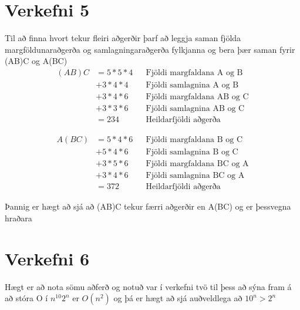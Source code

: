 \documentclass{article}
\begin{document}
\newpage
\section*{Verkefni 5}
Til að finna hvort tekur fleiri aðgerðir þarf að leggja saman fjölda margföldunaraðgerða og samlagningaraðgerða fylkjanna og bera þær saman fyrir (AB)C og A(BC)
\begin{align*}
    (AB)C 
    &=5*5*4 &&\text{Fjöldi margfaldana A og B}\\
    &+3*4*4 &&\text{Fjöldi samlagnina A og B}\\
    &+3*4*6 &&\text{Fjöldi margfaldana AB og C}\\
    &+3*3*6 &&\text{Fjöldi samlagnina AB og C}\\
    &=234 &&\text{Heildarfjöldi aðgerða}
\end{align*}

\begin{align*}
    A(BC) 
    &=5*4*6 &&\text{Fjöldi margfaldana B og C}\\
    &+5*4*6 &&\text{Fjöldi samlagnina B og C}\\
    &+3*5*6 &&\text{Fjöldi margfaldana BC og A}\\
    &+3*4*6 &&\text{Fjöldi samlagnina BC og A}\\
    &=372 &&\text{Heildarfjöldi aðgerða}
\end{align*}

Þannig er hægt að sjá að (AB)C tekur færri aðgerðir en A(BC) og er þessvegna hraðara

\section*{Verkefni 6}
Hægt er að nota sömu aðferð og notuð var í verkefni tvö til þess að sýna fram á að stóra O í $n^{10}2^n$ er $O(n^2)$ og þá er hægt að sjá auðveldlega að $10^n>2^n$
\end{document}
